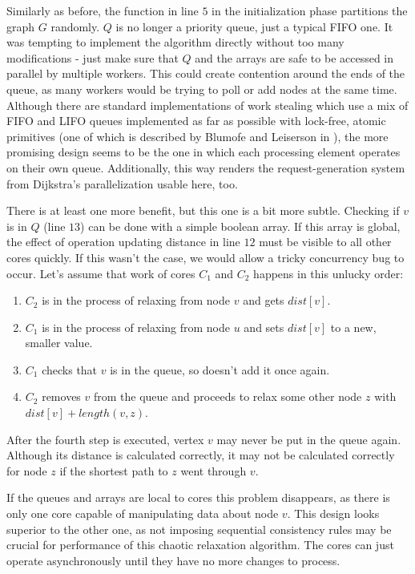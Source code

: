 \documentclass[12pt,a4paper,twoside,openright]{report}
\begin{document}
Similarly as before, the function in line $5$ in the initialization phase partitions the graph $G$ randomly. $Q$ is no longer a priority queue, just a typical FIFO one. It was tempting to implement the algorithm directly without too many modifications - just make sure that $Q$ and the arrays are safe to be accessed in parallel by multiple workers. This could create contention around the ends of the queue, as many workers would be trying to poll or add nodes at the same time. Although there are standard implementations of work stealing which use a mix of FIFO and LIFO queues implemented as far as possible with lock-free, atomic primitives (one of which is described by Blumofe and Leiserson in  \cite{workstealing}), the more promising design seems to be the one in which each processing element operates on their own queue. Additionally, this way renders the  request-generation system from Dijkstra's parallelization usable here, too. 

There is at least one more benefit, but this one is a bit more subtle. Checking if $v$ is in $Q$ (line $13$) can be done with a simple boolean array. If this array is global, the effect of operation updating distance in line $12$ must be visible to all other cores quickly. If this wasn't the case, we would allow a tricky concurrency bug to occur. Let's assume that work of cores $C_1$ and $C_2$ happens in this unlucky order:

\begin{enumerate}
    \item $C_2$ is in the process of relaxing from node $v$ and gets $dist[v]$.
    \item $C_1$ is in the process of relaxing from node $u$ and sets $dist[v]$ to a new, smaller value.
    \item $C_1$ checks that $v$ is in the queue, so doesn't add it once again.
    \item $C_2$ removes $v$ from the queue and proceeds to relax some other node $z$ with $dist[v] + length(v, z)$.
\end{enumerate}
After the fourth step is executed, vertex $v$ may never be put in the queue again. Although its distance is calculated correctly, it may not be calculated correctly for node $z$ if the shortest path to $z$ went through $v$.

If the queues and arrays are local to cores this problem disappears, as there is only one core capable of manipulating data about node $v$. This design looks superior to the other one, as not imposing sequential consistency rules may be crucial for performance of this chaotic relaxation algorithm. The cores can just operate asynchronously until they have no more changes to process.
\end{document}
